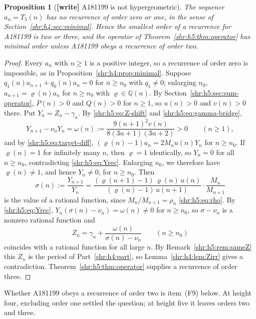 \documentclass[11pt,letterpaper]{article}
\numberwithin{equation}{section}
\newtheorem{proposition}[theorem]{Proposition}
\theoremstyle{definition}
\newcommand{\Q}{\mathbb Q}
\newcommand{\1}{\mathbf 1}
\begin{document}
\begin{proposition}[\textbf{[write]} A181199 is not hypergeometric]
\label{shr:h5:prop:nothyper}
The sequence $a_n=T_5(n)$ has no recurrence of order zero or one, in the
sense of Section~\ref{shr:h4:sec:minimal}. Hence the smallest order of a
recurrence for A181199 is two or three, and the operator of
Theorem~\ref{shr:h5:thm:operator} has minimal order unless A181199 obeys a
recurrence of order two.
\end{proposition}

\begin{proof}
Every $a_n$ with $n\ge1$ is a positive integer, so a recurrence of order
zero is impossible, as in Proposition~\ref{shr:h4:prop:minimal}. Suppose
$q_1(n)a_{n+1}+q_0(n)a_n=0$ for $n\ge n_0$ with $q_1\ne0$; enlarging
$n_0$, $a_{n+1}=\varrho(n)a_n$ for $n\ge n_0$ with $\varrho\in\Q(n)$. By
Section~\ref{shr:h5:sec:sum-operator}, $P(n)>0$ and $Q(n)>0$ for $n\ge1$,
so $u(n)>0$ and $v(n)>0$ there. Put $Y_n=Z_n-\gamma_n$. By
\eqref{shr:h5:eq:Z-shift} and \eqref{shr:h5:eq:gamma-bridge},
\begin{equation}
 Y_{n+1}-\nu_nY_n=\omega(n):=\frac{9(n+1)^2v(n)}{8(3n+1)(3n+2)}>0
 \qquad(n\ge1),
 \label{shr:h5:eq:Yrec}
\end{equation}
and by \eqref{shr:h5:eq:target-diff},
$(\varrho(n)-1)a_n=2M_nu(n)Y_n$ for $n\ge n_0$. If $\varrho(n)=1$ for
infinitely many $n$, then $\varrho=1$ identically, so $Y_n=0$ for all
$n\ge n_0$, contradicting \eqref{shr:h5:eq:Yrec}. Enlarging $n_0$, we
therefore have $\varrho(n)\ne1$, and hence $Y_n\ne0$, for $n\ge n_0$. Then
\[
 \sigma(n):=\frac{Y_{n+1}}{Y_n}
 =\frac{(\varrho(n+1)-1)\,\varrho(n)\,u(n)}{(\varrho(n)-1)\,u(n+1)}
 \cdot\frac{M_n}{M_{n+1}}
\]
is the value of a rational function, since $M_n/M_{n+1}=\rho_n$
\eqref{shr:h5:eq:rho}. By \eqref{shr:h5:eq:Yrec},
$Y_n(\sigma(n)-\nu_n)=\omega(n)\ne0$ for $n\ge n_0$, so $\sigma-\nu_n$ is
a nonzero rational function and
\[
 Z_n=\gamma_n+\frac{\omega(n)}{\sigma(n)-\nu_n}\qquad(n\ge n_0)
\]
coincides with a rational function for all large $n$. By
Remark~\ref{shr:h5:rem:sameZ} this $Z_n$ is the period of
Part~\ref{shr:h4:part}, so Lemma~\ref{shr:h4:lem:Zirr} gives a
contradiction. Theorem~\ref{shr:h5:thm:operator} supplies a recurrence of
order three.
\end{proof}

Whether A181199 obeys a recurrence of order two is item~(F9) below. At
height four, excluding order one settled the question; at height five it
leaves orders two and three.
\end{document}
